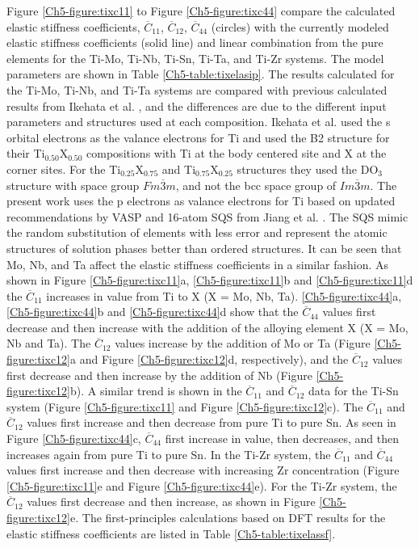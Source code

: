 Figure \ref{Ch5-figure:tixc11} to Figure \ref{Ch5-figure:tixc44} compare the calculated elastic stiffness coefficients, $\overline{C}_{11}$, $\overline{C}_{12}$, $\overline{C}_{44}$ (circles) with the currently modeled elastic stiffness coefficients (solid line) and linear combination from the pure elements for the Ti-Mo, Ti-Nb, Ti-Sn, Ti-Ta, and Ti-Zr systems. The model parameters are shown in Table \ref{Ch5-table:tixelasip}. The results calculated for the Ti-Mo, Ti-Nb, and Ti-Ta systems are compared with previous calculated results from Ikehata et al. \cite{Ikehata2004}, and the differences are due to the different input parameters and structures used at each composition. Ikehata et al. \cite{Ikehata2004} used the s orbital electrons as the valance electrons for Ti and used the B2 structure for their Ti$_{0.50}$X$_{0.50}$ compositions with Ti at the body centered site and X at the corner sites. For the Ti$_{0.25}$X$_{0.75}$ and Ti$_{0.75}$X$_{0.25}$ structures they used the DO$_{3}$ structure with space group $Fm\overline{3}m$, and not the bcc space group of $Im\overline{3}m$. The present work uses the p electrons as valance electrons for Ti based on updated recommendations by VASP and 16-atom SQS from Jiang et al. \cite{Jiang2004}. The SQS mimic the random substitution of elements with less error and represent the atomic structures of solution phases better than ordered structures. It can be seen that Mo, Nb, and Ta affect the elastic stiffness coefficients in a similar fashion. As shown in Figure \ref{Ch5-figure:tixc11}a, \ref{Ch5-figure:tixc11}b and \ref{Ch5-figure:tixc11}d the $\overline{C}_{11}$ increases in value from Ti to X (X = Mo, Nb, Ta). \ref{Ch5-figure:tixc44}a, \ref{Ch5-figure:tixc44}b and \ref{Ch5-figure:tixc44}d show that the $\overline{C}_{44}$ values first decrease and then increase with the addition of the alloying element X (X = Mo, Nb and Ta). The $\overline{C}_{12}$ values increase by the addition of Mo or Ta (Figure \ref{Ch5-figure:tixc12}a and Figure \ref{Ch5-figure:tixc12}d, respectively), and the $\overline{C}_{12}$ values first decrease and then increase by the addition of Nb (Figure \ref{Ch5-figure:tixc12}b). A similar trend is shown in the $\overline{C}_{11}$ and $\overline{C}_{12}$ data for the Ti-Sn system (Figure \ref{Ch5-figure:tixc11} and Figure \ref{Ch5-figure:tixc12}c). The $\overline{C}_{11}$ and $\overline{C}_{12}$ values first increase and then decrease from pure Ti to pure Sn. As seen in Figure \ref{Ch5-figure:tixc44}c, $\overline{C}_{44}$ first increase in value, then decreases, and then increases again from pure Ti to pure Sn. In the Ti-Zr system, the $\overline{C}_{11}$ and $\overline{C}_{44}$ values first increase and then decrease with increasing Zr concentration (Figure \ref{Ch5-figure:tixc11}e and Figure \ref{Ch5-figure:tixc44}e). For the Ti-Zr system, the $\overline{C}_{12}$ values first decrease and then increase, as shown in Figure \ref{Ch5-figure:tixc12}e. The first-principles calculations based on DFT results for the elastic stiffness coefficients are listed in Table \ref{Ch5-table:tixelassf}.

